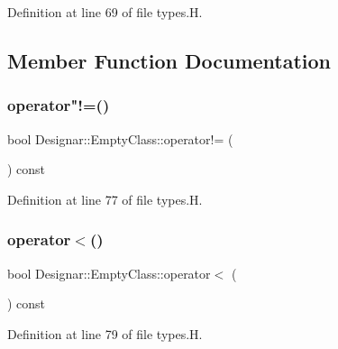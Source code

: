 Definition at line 69 of file types.\+H.



\subsection{Member Function Documentation}
\mbox{\label{class_designar_1_1_empty_class_aafdaf95265007ed710e7b2393921d805}} 
\subsubsection{\texorpdfstring{operator"!=()}{operator!=()}}
{\footnotesize\ttfamily bool Designar\+::\+Empty\+Class\+::operator!= (\begin{DoxyParamCaption}\item[{const \hyperlink{class_designar_1_1_empty_class}{Empty\+Class} \&}]{ }\end{DoxyParamCaption}) const\hspace{0.3cm}{\ttfamily [inline]}}



Definition at line 77 of file types.\+H.

\mbox{\label{class_designar_1_1_empty_class_ae08a3c7c6b6d1d8bd73a52bf4f7be4fb}} 
\subsubsection{\texorpdfstring{operator$<$()}{operator<()}}
{\footnotesize\ttfamily bool Designar\+::\+Empty\+Class\+::operator$<$ (\begin{DoxyParamCaption}\item[{const \hyperlink{class_designar_1_1_empty_class}{Empty\+Class} \&}]{ }\end{DoxyParamCaption}) const\hspace{0.3cm}{\ttfamily [inline]}}



Definition at line 79 of file types.\+H.

\mbox{\label{class_designar_1_1_empty_class_a92e2e8f4d9b8d7ac7b6f2295242dd447}} 
